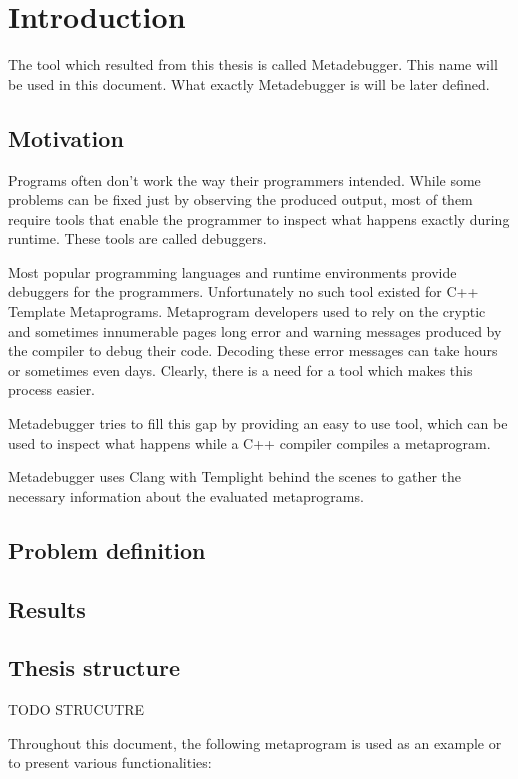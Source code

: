 
\chapter{Introduction}

The tool which resulted from this thesis is called Metadebugger. This name will
be used in this document. What exactly Metadebugger is will be later defined.

\section{Motivation}

Programs often don't work the way their programmers intended. While some
problems can be fixed just by observing the produced output, most of them
require tools that enable the programmer to inspect what happens exactly
during runtime. These tools are called debuggers.

Most popular programming languages and runtime environments provide debuggers
for the programmers. Unfortunately no such tool existed for C++ Template
Metaprograms. Metaprogram developers used to rely on the cryptic and sometimes
innumerable pages long error and warning messages produced by the compiler to
debug their code. Decoding these error messages can take hours or sometimes
even days. Clearly, there is a need for a tool which makes this process easier.

Metadebugger tries to fill this gap by providing an easy to use tool, which can
be used to inspect what happens while a C++ compiler compiles a metaprogram.

Metadebugger uses Clang with Templight behind the scenes to gather the
necessary information about the evaluated metaprograms.

\section{Problem definition}

\section{Results} %

\section{Thesis structure}

TODO STRUCUTRE

Throughout this document, the following metaprogram is used as an example or to
present various functionalities:

